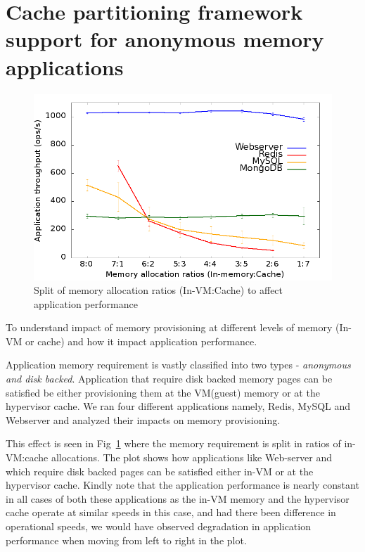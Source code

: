     
    \section{Cache partitioning framework support for anonymous memory applications} 
	
	\begin{figure}
	  \centering
	  \includegraphics[scale=0.6]{images/dd_decentrailze_motivation/throughput.png}
	  \caption{Split of memory allocation ratios (In-VM:Cache) to affect application performance}
	  \label{plot:dd_decentrailze_motivation}
	\end{figure}
	
	  To understand impact of memory provisioning at different levels of memory (In-VM or cache)
	  and how it impact application performance.
	
	  Application memory requirement is vastly classified into two types - \textit{anonymous and disk backed}.
	  Application that require disk backed memory pages can be satisfied be either provisioning them at the 
	  VM(guest) memory or at the hypervisor cache. We ran four different applications namely, Redis, \mongo{}
	  MySQL and Webserver and analyzed their impacts on memory provisioning.
	  
	  This effect is seen in Fig~\ref{plot:dd_decentrailze_motivation}
	  where the memory requirement is split in ratios of in-VM:cache allocations. The plot shows how applications like
	  Web-server and \mongo{} which require disk backed pages can be satisfied either in-VM or at the hypervisor cache.
	  Kindly note that the application performance is nearly constant in all cases of both these applications as the 
	  in-VM memory and the hypervisor cache operate at similar speeds in this case, and had there been difference in
	  operational speeds, we would have observed degradation in application performance when moving from left to right 
	  in the plot.
	
